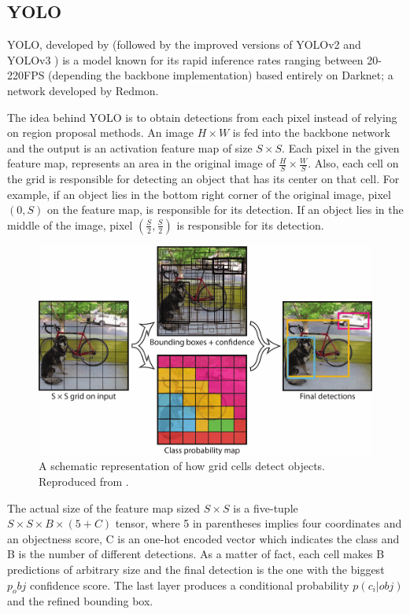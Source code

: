  \subsection{YOLO}
 YOLO, developed by \cite{redmon2016you} (followed by the improved versions of YOLOv2 \cite{redmon2017yolo9000} and YOLOv3 \cite{redmon2018yolov3}) is a model known for its rapid inference 
 rates ranging between 20-220FPS (depending the backbone implementation) based entirely on Darknet; a network developed by Redmon.
 
 The idea behind YOLO is to obtain detections from each pixel instead of relying on region proposal methods. An image $H\times W$ is fed into the backbone network and the output is an activation feature map of size $S\times S$. Each pixel in the given feature map, represents an area in the original image of $\frac{H}{S} \times \frac{W}{S}$. Also, each cell on the grid is responsible for detecting an object that has its center on that cell. For example, if an object lies in the bottom right corner of the original image, pixel $(0,S)$ on the feature map, is responsible for its detection. If an object lies in the middle of the image, pixel $(\frac{S}{2},\frac{S}{2})$ is responsible for its detection. 
 
\begin{figure}[!htb]
  \centering
  \includegraphics[width=12cm]{images/ch2/fig5.png}
  \caption{A schematic representation of how grid cells detect objects. Reproduced from \cite{redmon2016you}.}
  \label{fig5}
\end{figure} 
 
The actual size of the feature map sized $S\times S$ is a five-tuple $S\times S \times B\times(5+C)$ tensor, where 5 in parentheses implies four coordinates and an objectness score, C is an one-hot encoded vector which indicates the class and B is the number of different detections. As a matter of fact, each cell makes B predictions of arbitrary size and the final detection is the one with the biggest $p_obj$ confidence score. The last layer produces a conditional probability $p(c_i|obj)$ and the refined bounding box.

